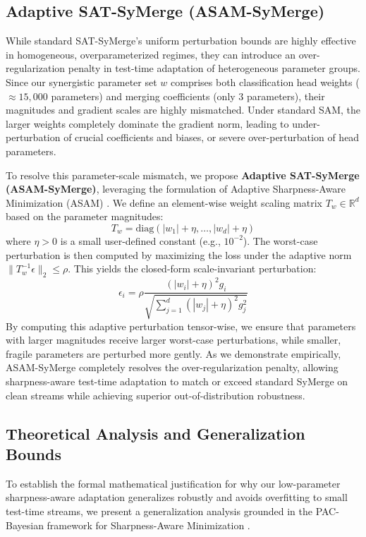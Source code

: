 \documentclass{article}
\begin{document}
\subsection{Adaptive SAT-SyMerge (ASAM-SyMerge)}
While standard SAT-SyMerge's uniform perturbation bounds are highly effective in homogeneous, overparameterized regimes, they can introduce an over-regularization penalty in test-time adaptation of heterogeneous parameter groups. Since our synergistic parameter set $w$ comprises both classification head weights ($\approx 15,000$ parameters) and merging coefficients (only $3$ parameters), their magnitudes and gradient scales are highly mismatched. Under standard SAM, the larger weights completely dominate the gradient norm, leading to under-perturbation of crucial coefficients and biases, or severe over-perturbation of head parameters.

To resolve this parameter-scale mismatch, we propose \textbf{Adaptive SAT-SyMerge (ASAM-SyMerge)}, leveraging the formulation of Adaptive Sharpness-Aware Minimization (ASAM) \cite{kwon2021asam}. We define an element-wise weight scaling matrix $T_w \in \mathbb{R}^d$ based on the parameter magnitudes:
\begin{equation}
    T_w = \text{diag}\left(|w_1| + \eta, \dots, |w_d| + \eta\right)
\end{equation}
where $\eta > 0$ is a small user-defined constant (e.g., $10^{-2}$). The worst-case perturbation is then computed by maximizing the loss under the adaptive norm $\| T_w^{-1} \epsilon \|_2 \le \rho$. This yields the closed-form scale-invariant perturbation:
\begin{equation}
    \epsilon_i = \rho \frac{(|w_i| + \eta)^2 g_i}{\sqrt{\sum_{j=1}^d (|w_j| + \eta)^2 g_j^2}}
\end{equation}
By computing this adaptive perturbation tensor-wise, we ensure that parameters with larger magnitudes receive larger worst-case perturbations, while smaller, fragile parameters are perturbed more gently. As we demonstrate empirically, ASAM-SyMerge completely resolves the over-regularization penalty, allowing sharpness-aware test-time adaptation to match or exceed standard SyMerge on clean streams while achieving superior out-of-distribution robustness.

\subsection{Theoretical Analysis and Generalization Bounds}
To establish the formal mathematical justification for why our low-parameter sharpness-aware adaptation generalizes robustly and avoids overfitting to small test-time streams, we present a generalization analysis grounded in the PAC-Bayesian framework for Sharpness-Aware Minimization \cite{foret2021sharpness,mcallester1999pac}.
\end{document}
